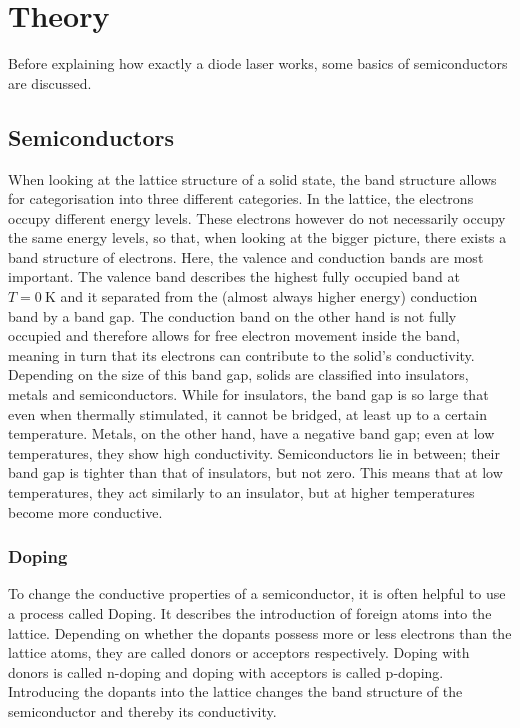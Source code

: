 \section{Theory}
\label{sec:theorie}

Before explaining how exactly a diode laser works, some basics of semiconductors are discussed.

\subsection{Semiconductors}

When looking at the lattice structure of a solid state, the band structure allows for categorisation into three different categories.
In the lattice, the electrons occupy different energy levels. These electrons however do not necessarily occupy the same energy levels, so that,
when looking at the bigger picture, there exists a band structure of electrons.
Here, the valence and conduction bands are most important.
The valence band describes the highest fully occupied band at $T = \SI{0}{\kelvin}$ and it separated from the (almost always higher energy) conduction band
by a band gap.
The conduction band on the other hand is not fully occupied and therefore allows for free electron movement inside the band, meaning in turn that its electrons
can contribute to the solid's conductivity.\\

Depending on the size of this band gap, solids are classified into insulators, metals and semiconductors.
While for insulators, the band gap is so large that even when thermally stimulated, it cannot be bridged, at least up to a certain temperature.
Metals, on the other hand, have a negative band gap; even at low temperatures, they show high conductivity.
Semiconductors lie in between; their band gap is tighter than that of insulators, but not zero.
This means that at low temperatures, they act similarly to an insulator, but at higher temperatures become more conductive.

\subsubsection{Doping}

To change the conductive properties of a semiconductor, it is often helpful to use a process called Doping.
It describes the introduction of foreign atoms into the lattice.
Depending on whether the dopants possess more or less electrons than the lattice atoms, they are called donors or acceptors respectively.
Doping with donors is called n-doping and doping with acceptors is called p-doping.
Introducing the dopants into the lattice changes the band structure of the semiconductor and thereby its conductivity. \\


